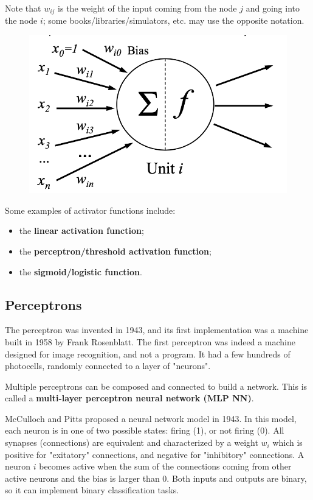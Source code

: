 Note that $w_{ij}$ is the weight of the input coming from the node $j$ and going into the node $i$; some books/libraries/simulators, etc. may use the opposite notation.

\begin{figure}[h]
    \centering
    \includegraphics[width=0.5\linewidth]{img/Neuron.png}
\end{figure}

Some examples of activator functions include:

\begin{itemize}
    \item the \textbf{linear activation function};
    \item the \textbf{perceptron/threshold activation function};
    \item the \textbf{sigmoid/logistic function}.
\end{itemize}

\subsection{Perceptrons}

The perceptron was invented in 1943, and its first implementation was a machine built in 1958 by Frank Rosenblatt. The first perceptron was indeed a machine designed for image recognition, and not a program. It had a few hundreds of photocells, randomly connected to a layer of "neurons".

Multiple perceptrons can be composed and connected to build a network. This is called a \textbf{multi-layer perceptron neural network (MLP NN)}. 

McCulloch and Pitts proposed a neural network model in 1943. In this model, each neuron is in one of two possible states: firing (1), or not firing (0). All synapses (connections) are equivalent and characterized by a weight $w_i$ which is positive for "exitatory" connections, and negative for "inhibitory" connections. A neuron $i$ becomes active when the sum of the connections coming from other active neurons and the bias is larger than 0. Both inputs and outputs are binary, so it can implement binary classification tasks.

